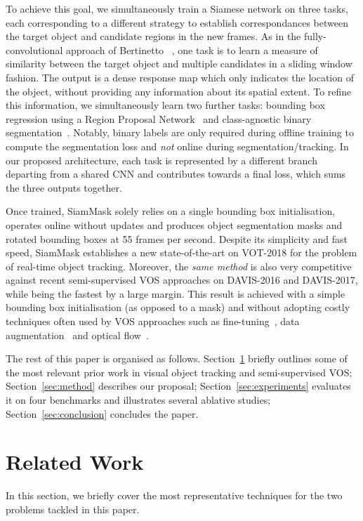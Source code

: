 \documentclass[10pt,twocolumn,letterpaper]{article}
\begin{document}
To achieve this goal, we simultaneously train a Siamese network on three tasks, each corresponding to a different strategy to establish correspondances between the target object and candidate regions in the new frames.
As in the fully-convolutional approach of Bertinetto \etal~\cite{bertinetto2016fully}, one task is to learn a measure of similarity between the target object and multiple candidates in a sliding window fashion.
The output is a dense response map which only indicates the location of the object, without providing any information about its spatial extent.
To refine this information, we simultaneously learn two further tasks: bounding box regression using a Region Proposal Network~\cite{ren2015faster,SiamRPN} and class-agnostic binary segmentation~\cite{DeepMask}.
Notably, binary labels are only required during offline training to compute the segmentation loss and \emph{not} online during segmentation/tracking. 
In our proposed architecture, each task is represented by a different branch departing from a shared CNN and contributes towards a final loss, which sums the three outputs together.

Once trained, SiamMask solely relies on a single bounding box initialisation, operates online without updates and produces object segmentation masks and rotated bounding boxes at 55 frames per second.
Despite its simplicity and fast speed, SiamMask establishes a new state-of-the-art on VOT-2018 for the problem of real-time object tracking.
Moreover, the \emph{same method} is also very competitive against recent semi-supervised VOS approaches on DAVIS-2016 and DAVIS-2017, while being the fastest by a large margin.
This result is achieved with a simple bounding box initialisation (as opposed to a mask) and without adopting costly techniques often used by VOS approaches such as fine-tuning~\cite{maninis2017video,perazzi2017learning,bao2018cnn,voigtlaender2017online}, data augmentation~\cite{LucidDataDreaming_CVPR17_workshops,li2018video} and optical flow~\cite{tsai2016video,bao2018cnn,perazzi2017learning,li2018video,cheng2018fast}.

The rest of this paper is organised as follows.
Section~\ref{sec:related} briefly outlines some of the most relevant prior work in visual object tracking and semi-supervised VOS; Section~\ref{sec:method} describes our proposal; Section~\ref{sec:experiments} evaluates it on four benchmarks and illustrates several ablative studies; Section~\ref{sec:conclusion} concludes the paper.
 
\section{ Related Work}
\label{sec:related}
In this section, we briefly cover the most representative techniques for the two problems tackled in this paper.
\end{document}

